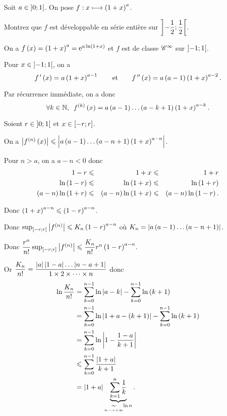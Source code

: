 \begin{exo}
Soit \(a\in\left]0;1\right[\). On pose \(f:x\longmapsto\left(1+x\right)^a\).

Montrez que \(f\) est développable en série entière sur \(\left]-\dfrac{1}{2};\dfrac{1}{2}\right[\).
\end{exo}

\begin{corr}
On a \(f\left(x\right)=\left(1+x\right)^a=\mathrm{e}^{a\ln\left(1+x\right)}\) et \(f\) est de classe \(\mathscr{C}^{\infty}\) sur \(\left]-1;1\right[\).

Pour \(x\in\left]-1;1\right[\), on a \[f^{\,\prime}\left(x\right)=a\left(1+x\right)^{a-1}\qquad\text{et}\qquad f^{\,\prime\prime}\left(x\right)=a\left(a-1\right)\left(1+x\right)^{a-2}.\]

Par récurrence immédiate, on a donc \[\quantifs{\forall k\in\N}f\deriv{k}\paren{x}=a\paren{a-1}\dots\paren{a-k+1}\paren{1+x}^{a-k}.\]

Soient \(r\in\left]0;1\right[\) et \(x\in\left[-r;r\right]\).

On a \(\left\lvert f^{\left(n\right)}\left(x\right)\right\rvert\leqslant\left\lvert a\left(a-1\right)\dots\left(a-n+1\right)\left(1+x\right)^{a-n}\right\rvert\).

Pour \(n>a\), on a \(a-n<0\) donc \[\begin{aligned}
1-r&\leqslant&1+x&\leqslant&1+r \\
\ln\left(1-r\right)&\leqslant&\ln\left(1+x\right)&\leqslant&\ln\left(1+r\right) \\
\left(a-n\right)\ln\left(1+r\right)&\leqslant&\left(a-n\right)\ln\left(1+x\right)&\leqslant&\left(a-n\right)\ln\left(1-r\right).
\end{aligned}\]

Donc \(\left(1+x\right)^{a-n}\leqslant\left(1-r\right)^{a-n}\).

Donc \(\sup_{\left[-r;r\right]}\left\lvert f^{\left(n\right)}\right\rvert\leqslant K_n\left(1-r\right)^{a-n}\) où \(K_n=\left\lvert a\left(a-1\right)\dots\left(a-n+1\right)\right\rvert\).

Donc \(\dfrac{r^n}{n!}\sup_{\left[-r;r\right]}\left\lvert f^{\left(n\right)}\right\rvert\leqslant\dfrac{K_n}{n!}r^n\left(1-r\right)^{a-n}\).

Or \(\dfrac{K_n}{n!}=\dfrac{\left\lvert a\right\rvert\left\lvert1-a\right\rvert\dots\left\lvert n-a+1\right\rvert}{1\times2\times\dots\times n}\) donc \[\begin{aligned}
\ln\dfrac{K_n}{n!}&=\sum_{k=0}^{n-1}\ln\left\lvert a-k\right\rvert-\sum_{k=0}^{n-1}\ln\left(k+1\right) \\
&=\sum_{k=0}^{n-1}\ln\left\lvert1+a-\left(k+1\right)\right\rvert-\sum_{k=0}^{n-1}\ln\left(k+1\right) \\
&=\sum_{k=0}^{n-1}\ln\left\lvert1-\dfrac{1-a}{k+1}\right\rvert \\
&\leqslant\sum_{k=0}^{n-1}\dfrac{\left\lvert1+a\right\rvert}{k+1} \\
&=\left\lvert1+a\right\rvert\underbrace{\sum_{k=1}^n\dfrac{1}{k}}_{\underset{n\longrightarrow+\infty}{\sim}\ln n}.
\end{aligned}\]


\end{corr}
